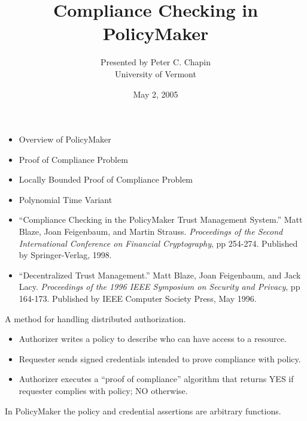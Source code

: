 \documentclass[landscape]{slides}
\begin{document}
\title{Compliance Checking in PolicyMaker}
\author{Presented by Peter C. Chapin\\University of Vermont}
\date{May 2, 2005}
\maketitle


\begin{itemize}
\item Overview of PolicyMaker
\item Proof of Compliance Problem
\item Locally Bounded Proof of Compliance Problem
\item Polynomial Time Variant
\end{itemize}

\stopslide


\begin{itemize}
\item ``Compliance Checking in the PolicyMaker Trust Management System.'' Matt Blaze, Joan Feigenbaum, and Martin Strauss. \textit{Proceedings of the Second International Conference on Financial Cryptography}, pp 254-274. Published by Springer-Verlag, 1998.
\item ``Decentralized Trust Management.'' Matt Blaze, Joan Feigenbaum, and Jack Lacy. \textit{Proceedings of the 1996 IEEE Symposium on Security and Privacy}, pp 164-173. Published by IEEE Computer Society Press, May 1996.
\end{itemize}

\stopslide

A method for handling distributed authorization.
\begin{itemize}
\item Authorizer writes a policy to describe who can have access to a resource.
\item Requester sends signed credentials intended to prove compliance with policy.
\item Authorizer executes a ``proof of compliance'' algorithm that returns YES if requester complies with policy; NO otherwise.
\end{itemize}
In PolicyMaker the policy and credential assertions are arbitrary functions.
\stopslide
\end{document}
